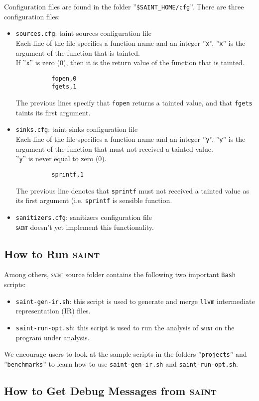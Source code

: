 \documentclass[11pt]{article} %
\newcommand{\saint}{\texttt{\textsc{saint}}\xspace}
\newcommand{\tool}[1]{\texttt{#1}\xspace}
\begin{document}
Configuration files are found in the folder ''\texttt{\$SAINT\_HOME/cfg}''.
There are three configuration files:
\begin{itemize}
	\item \texttt{sources.cfg}: taint sources configuration file\\
		  Each line of the file specifies a function name and an integer ''\texttt{x}''.
		  ''\texttt{x}'' is the argument of the function that is tainted.\\
		  If ''\texttt{x}'' is zero (0), then it is the return value of the function that is tainted.
		  \begin{verbatim}
		  fopen,0
		  fgets,1		  
		  \end{verbatim}
		  The previous lines specify that \texttt{fopen} returns a tainted value, and
		  that \texttt{fgets} taints its first argument. 
	\item \texttt{sinks.cfg}: taint sinks configuration file\\
		  Each line of the file specifies a function name and an integer ''\texttt{y}''.
		  ''\texttt{y}'' is the argument of the function that must not received a tainted value.\\
		  ''\texttt{y}'' is never equal to zero (0).
		  \begin{verbatim}
		  sprintf,1	  
		  \end{verbatim}
		  The previous line denotes that \texttt{sprintf} must not received
		  a tainted value as its first argument (i.e. \texttt{sprintf} is 
		  sensible function.
	\item \texttt{sanitizers.cfg}: sanitizers configuration file\\
		  \saint doesn't yet implement this functionality.
\end{itemize}

\subsection{How to Run \textsc{saint}}
Among others, \saint source folder contains the following two important
\texttt{Bash} scripts:
\begin{itemize}
	\item \texttt{saint-gen-ir.sh}: this script is used to generate and
		merge \tool{llvm} intermediate representation (IR) files. 
	
	\item \texttt{saint-run-opt.sh}: this script is used to run the analysis of
		\saint on the program under analysis.
\end{itemize}

We encourage users to look at the sample scripts in the
folders ''\texttt{projects}'' and ''\texttt{benchmarks}''
to learn how to use \texttt{saint-gen-ir.sh} and
\texttt{saint-run-opt.sh}.
		
\subsection{How to Get Debug Messages from \textsc{saint}}		




\end{document}
